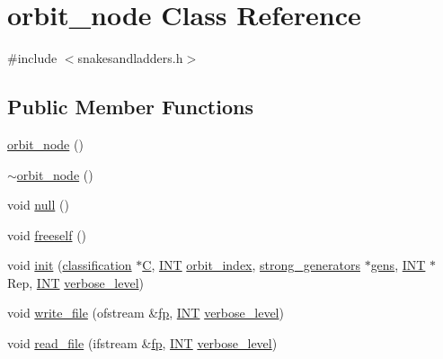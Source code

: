 \hypertarget{classorbit__node}{}\section{orbit\+\_\+node Class Reference}
\label{classorbit__node}


{\ttfamily \#include $<$snakesandladders.\+h$>$}

\subsection*{Public Member Functions}
\begin{DoxyCompactItemize}
\item 
\mbox{\hyperlink{classorbit__node_ae8406bf12637d61a8709e2adb62829b0}{orbit\+\_\+node}} ()
\item 
\mbox{\hyperlink{classorbit__node_afdc3c9464a5706d6a6c8888ff44f0a4c}{$\sim$orbit\+\_\+node}} ()
\item 
void \mbox{\hyperlink{classorbit__node_aa61b03672f85f0cc9cac8cc1157a42d0}{null}} ()
\item 
void \mbox{\hyperlink{classorbit__node_a031cc1260a61e9431d21144f0dbeb65b}{freeself}} ()
\item 
void \mbox{\hyperlink{classorbit__node_a9ebab01e3e2190f89c8c513e8de94487}{init}} (\mbox{\hyperlink{classclassification}{classification}} $\ast$\mbox{\hyperlink{classorbit__node_ae7271bc8e762406e0b94f208a2b99230}{C}}, \mbox{\hyperlink{galois_8h_a09fddde158a3a20bd2dcadb609de11dc}{I\+NT}} \mbox{\hyperlink{classorbit__node_a4565d1b24e3cf2c0edb83c9d6e992ba9}{orbit\+\_\+index}}, \mbox{\hyperlink{classstrong__generators}{strong\+\_\+generators}} $\ast$\mbox{\hyperlink{classorbit__node_a8c7e073aa3d5cf44690dd518b0f9414d}{gens}}, \mbox{\hyperlink{galois_8h_a09fddde158a3a20bd2dcadb609de11dc}{I\+NT}} $\ast$Rep, \mbox{\hyperlink{galois_8h_a09fddde158a3a20bd2dcadb609de11dc}{I\+NT}} \mbox{\hyperlink{simeon_8_c_a818073fbcc2f439e7c56952f67386122}{verbose\+\_\+level}})
\item 
void \mbox{\hyperlink{classorbit__node_a4ce61fe0a32a2fc5768effc348a84b1e}{write\+\_\+file}} (ofstream \&\mbox{\hyperlink{k__arc__lifting_8_c_a67cc9fbd0817c2d140368e5ed1f2a44d}{fp}}, \mbox{\hyperlink{galois_8h_a09fddde158a3a20bd2dcadb609de11dc}{I\+NT}} \mbox{\hyperlink{simeon_8_c_a818073fbcc2f439e7c56952f67386122}{verbose\+\_\+level}})
\item 
void \mbox{\hyperlink{classorbit__node_a25962200ff16e51b7189e516e92a81af}{read\+\_\+file}} (ifstream \&\mbox{\hyperlink{k__arc__lifting_8_c_a67cc9fbd0817c2d140368e5ed1f2a44d}{fp}}, \mbox{\hyperlink{galois_8h_a09fddde158a3a20bd2dcadb609de11dc}{I\+NT}} \mbox{\hyperlink{simeon_8_c_a818073fbcc2f439e7c56952f67386122}{verbose\+\_\+level}})
\end{DoxyCompactItemize}
